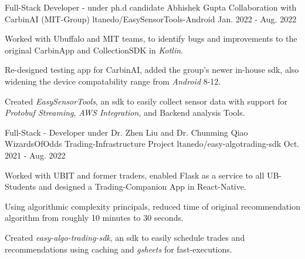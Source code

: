 

\begin{cventries}

\cventry
  {Full-Stack Developer - under ph.d candidate Abhishek Gupta} %
  {Collaboration with CarbinAI (MIT-Group)} %
  { ltanedo/EasySensorTools-Android } %
  {Jan. 2022 - Aug. 2022} %
  {
    \begin{cvitems} %
      \item {Worked with Ubuffalo and MIT teams, to identify bugs and improvements to the original CarbinApp and CollectionSDK in \textit{Kotlin}.}
      \item {Re-designed testing app for CarbinAI, added the group's newer in-house sdk, also widening the device compatability range from \textit{Android} 8-12.}
      \item {Created \textit{EasySensorTools}, an sdk to easily collect sensor data with support for \textit{Protobuf Streaming}, \textit{AWS Integration}, and Backend analysis Tools.  }
    \end{cvitems}
  }

\cventry
  {Full-Stack - Developer under Dr. Zhen Liu and Dr. Chunming Qiao} %
  {WizardsOfOdds Trading-Infrastructure Project} %
  { ltanedo/easy-algotrading-sdk } %
  {Oct. 2021 - Aug. 2022} %
  {
    \begin{cvitems} %
      \item { Worked with UBIT and former traders, enabled Flask as a service to all UB-Students and designed a Trading-Companion App in React-Native.}
      \item { Using algorithmic complexity principals, reduced time of original recommendation algorithm from roughly 10 minutes to 30 seconds. }
      \item { Created \textit{easy-algo-trading-sdk}, an sdk to easily schedule trades and recommendations using caching and \textit{gsheets} for fast-executions. }
    \end{cvitems}
  }


\end{cventries}
